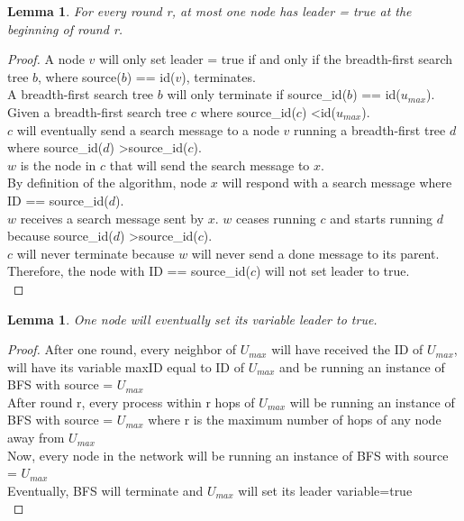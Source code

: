 \documentclass[english]{article}
\newtheorem{lemma}[theorem]{Lemma}
\begin{document}
\begin{lemma}
\label{LESafetyStatic}
For every round r, at most one node has leader = true at the beginning of round r.
\end{lemma}
\begin{proof}

A node $v$ will only set leader = true if and only if the breadth-first search tree $b$, where source($b$) == id($v$), terminates. \\

A breadth-first search tree $b$ will only terminate if source_id($b$) == id($u_{max}$). \\

Given a breadth-first search tree $c$ where source_id($c$) \textless id($u_{max}$). \\

$c$ will eventually send a search message to a node $v$ running a breadth-first tree $d$ where source_id($d$) \textgreater source_id($c$). \\

$w$ is the node in $c$ that will send the search message to $x$. \\

By definition of the algorithm, node $x$ will respond with a search message where ID == source_id($d$). \\

$w$ receives a search message sent by $x$. $w$ ceases running $c$ and starts running $d$ because source_id($d$) \textgreater source_id($c$). \\

$c$ will never terminate because $w$ will never send a done message to its parent. Therefore, the node with ID == source_id($c$) will not set leader to true. \\

\end{proof}

\begin{lemma}
\label{LELivenessStatic}
One node will eventually set its variable leader to true.
\end{lemma}
\begin{proof}

After one round, every neighbor of $U_{max}$ will have received the ID of $U_{max}$, will have its variable maxID equal to ID of $U_{max}$ and be running an instance of BFS with source = $U_{max}$ \\
After round r, every process within r hops of $U_{max}$ will be running an instance of BFS with source = $U_{max}$ where r is the maximum number of hops of any node away from $U_{max}$ \\
Now, every node in the network will be running an instance of BFS with source = $U_{max}$ \\
Eventually, BFS will terminate and $U_{max}$ will set its leader variable=true \\
\end{proof}
\end{document}
